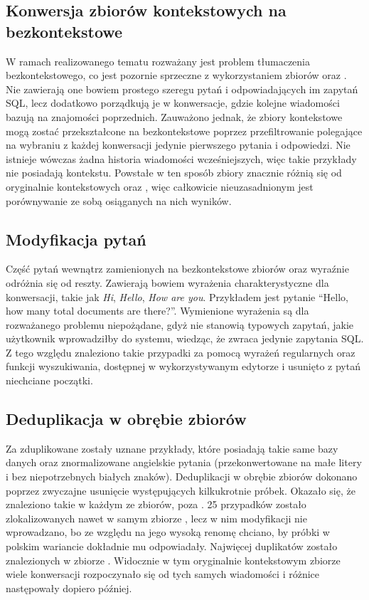 \subsection{Konwersja zbiorów kontekstowych na bezkontekstowe}
W ramach realizowanego tematu rozważany jest problem tłumaczenia bezkontekstowego, co jest pozornie sprzeczne z wykorzystaniem zbiorów  oraz . Nie zawierają one bowiem prostego szeregu pytań i odpowiadających im zapytań SQL, lecz dodatkowo porządkują je w konwersacje, gdzie kolejne wiadomości bazują na znajomości poprzednich. Zauważono jednak, że zbiory kontekstowe mogą zostać przekształcone na bezkontekstowe poprzez przefiltrowanie polegające na wybraniu z każdej konwersacji jedynie pierwszego pytania i odpowiedzi. Nie istnieje wówczas żadna historia wiadomości wcześniejszych, więc takie przykłady nie posiadają kontekstu. Powstałe w ten sposób zbiory znacznie różnią się od oryginalnie kontekstowych  oraz , więc całkowicie nieuzasadnionym jest porównywanie ze sobą osiąganych na nich wyników.

\subsection{Modyfikacja pytań}
Część pytań wewnątrz zamienionych na bezkontekstowe zbiorów  oraz  wyraźnie odróżnia się od reszty. Zawierają bowiem wyrażenia charakterystyczne dla konwersacji, takie jak \textit{Hi}, \textit{Hello}, \textit{How are you}. Przykładem jest pytanie \enquote{Hello, how many total documents are there?}. Wymienione wyrażenia są dla rozważanego problemu niepożądane, gdyż nie stanowią typowych zapytań, jakie użytkownik wprowadziłby do systemu, wiedząc, że zwraca jedynie zapytania SQL. Z tego względu znaleziono takie przypadki za pomocą wyrażeń regularnych oraz funkcji wyszukiwania, dostępnej w wykorzystywanym edytorze i usunięto z pytań niechciane początki.

\subsection{Deduplikacja w obrębie zbiorów}
Za zduplikowane zostały uznane przykłady, które posiadają takie same bazy danych oraz znormalizowane angielskie pytania (przekonwertowane na małe litery i bez niepotrzebnych białych znaków). Deduplikacji w obrębie zbiorów dokonano poprzez zwyczajne usunięcie występujących kilkukrotnie próbek. Okazało się, że znaleziono takie w każdym ze zbiorów, poza . 25 przypadków zostało zlokalizowanych nawet w samym zbiorze , lecz w nim modyfikacji nie wprowadzano, bo ze względu na jego wysoką renomę chciano, by próbki w polskim wariancie dokładnie mu odpowiadały. Najwięcej duplikatów zostało znalezionych w zbiorze . Widocznie w tym oryginalnie kontekstowym zbiorze wiele konwersacji rozpoczynało się od tych samych wiadomości i różnice następowały dopiero później.

